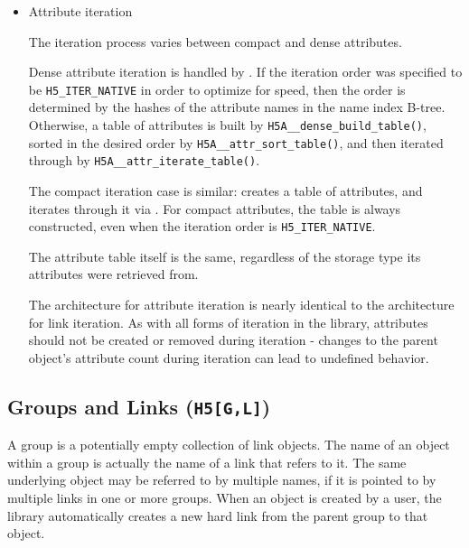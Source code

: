 \begin{itemize}
    \item Attribute iteration

The iteration process varies between compact and dense attributes.

Dense attribute iteration is handled by . If the iteration order was specified to be \texttt{H5\_ITER\_NATIVE} in order to optimize for speed, then the order is determined by the hashes of the attribute names in the name index B-tree. Otherwise, a table of attributes is built by \texttt{H5A\_\_dense\_build\_table()}, sorted in the desired order by \texttt{H5A\_\_attr\_sort\_table()}, and then iterated through by \texttt{H5A\_\_attr\_iterate\_table()}.

The compact iteration case is similar:  creates a table of attributes, and iterates through it via . For compact attributes, the table is always constructed, even when the iteration order is \texttt{H5\_ITER\_NATIVE}.

The attribute table itself is the same, regardless of the storage type its attributes were retrieved from.

The architecture for attribute iteration is nearly identical to the architecture for link iteration. As with all forms of iteration in the library, attributes should not be created or removed during iteration - changes to the parent object's attribute count during iteration can lead to undefined behavior.

\end{itemize}

\subsection{Groups and Links (\texttt{H5[G,L]})}



A group is a potentially empty collection of link objects. The name of an object within a group is actually the name of a link that refers to it. The same underlying object may be referred to by multiple names, if it is pointed to by multiple links in one or more groups. When an object is created by a user, the library automatically creates a new hard link from the parent group to that object.

